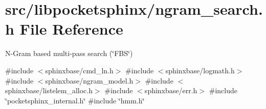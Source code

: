 \section{src/libpocketsphinx/ngram\-\_\-search.h \-File \-Reference}
\label{ngram__search_8h}


\-N-\/\-Gram based multi-\/pass search (\char`\"{}\-F\-B\-S\char`\"{})  


{\ttfamily \#include $<$sphinxbase/cmd\-\_\-ln.\-h$>$}\*
{\ttfamily \#include $<$sphinxbase/logmath.\-h$>$}\*
{\ttfamily \#include $<$sphinxbase/ngram\-\_\-model.\-h$>$}\*
{\ttfamily \#include $<$sphinxbase/listelem\-\_\-alloc.\-h$>$}\*
{\ttfamily \#include $<$sphinxbase/err.\-h$>$}\*
{\ttfamily \#include \char`\"{}pocketsphinx\-\_\-internal.\-h\char`\"{}}\*
{\ttfamily \#include \char`\"{}hmm.\-h\char`\"{}}\*
